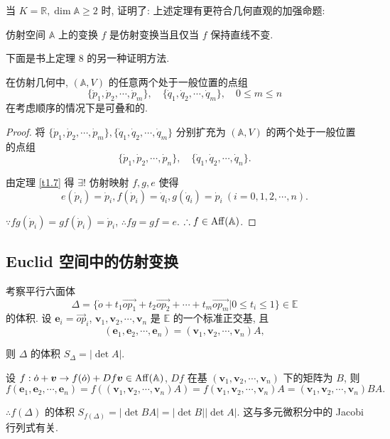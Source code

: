 \documentclass[color=black,device=normal,lang=cn,mode=geye]{elegantnote}
\begin{document}
当 $K=\mathbb{R},\dim\mathbb{A}\geq2$ 时, \cite[p41]{geometry} 证明了: 上述定理有更符合几何直观的加强命题:
\begin{theorem}
    仿射空间 $\mathbb{A}$ 上的变换 $f$ 是仿射变换当且仅当 $f$ 保持直线不变.
\end{theorem}
下面是书上定理 8 的另一种证明方法.
\begin{theorem}[书上的定理 8]\label{t3.8}
    在仿射几何中, $(\mathbb{A},V)$ 的任意两个处于一般位置的点组
    \[\{\dot{p}_1,\dot{p}_2,\cdots,\dot{p}_m\},\quad\{\dot{q}_1,\dot{q}_2,\cdots,\dot{q}_m\},\quad0\leq m\leq n\]
    在考虑顺序的情况下是可叠和的.
\end{theorem}
\begin{proof}
    将 $\{\dot{p}_1,\dot{p}_2,\cdots,\dot{p}_m\},\{\dot{q}_1,\dot{q}_2,\cdots,\dot{q}_m\}$ 分别扩充为 $(\mathbb{A},V)$ 的两个处于一般位置的点组
    \[\{\dot{p}_1,\dot{p}_2,\cdots,\dot{p}_n\},\quad\{\dot{q}_1,\dot{q}_2,\cdots,\dot{q}_n\}.\]

    由定理 \ref{t1.7} 得 $\exists!$ 仿射映射 $f,g,e$ 使得
    \[e(\dot{p}_i)=\dot{p}_i,f(\dot{p}_i)=\dot{q}_i,g(\dot{q}_i)=\dot{p}_i\ (i=0,1,2,\cdots,n).\]

    $\because fg(\dot{p}_i)=gf(\dot{p}_i)=\dot{p}_i$, $\therefore fg=gf=e$. $\therefore f\in\operatorname{Aff} (\mathbb{A})$.
\end{proof}
\subsection{Euclid 空间中的仿射变换}
考察平行六面体
\[\Delta=\{\dot{o}+t_1\overrightarrow{op_1}+t_2\overrightarrow{op_2}+\cdots+t_m\overrightarrow{op_m}|0\leq t_i\leq1\}\in\mathbb{E}\]
的体积. 设 $\boldsymbol{e}_i=\overrightarrow{op}_i$, $\boldsymbol{v}_1,\boldsymbol{v}_2,\cdots,\boldsymbol{v}_n$ 是 $\mathbb{E}$ 的一个标准正交基, 且
\[(\boldsymbol{e}_1,\boldsymbol{e}_2,\cdots,\boldsymbol{e}_n)=(\boldsymbol{v}_1,\boldsymbol{v}_2,\cdots,\boldsymbol{v}_n)A,\]

则 $\Delta$ 的体积 $S_\Delta=|\det A|$.

设 $f:\dot{o}+\boldsymbol{v}\to f(\dot{o})+Df\boldsymbol{v}\in\operatorname{Aff} (\mathbb{A})$, $Df$ 在基 $(\boldsymbol{v}_1,\boldsymbol{v}_2,\cdots,\boldsymbol{v}_n)$ 下的矩阵为 $B$, 则
\[f(\boldsymbol{e}_1,\boldsymbol{e}_2,\cdots,\boldsymbol{e}_n)=f((\boldsymbol{v}_1,\boldsymbol{v}_2,\cdots,\boldsymbol{v}_n)A)=f(\boldsymbol{v}_1,\boldsymbol{v}_2,\cdots,\boldsymbol{v}_n)A=(\boldsymbol{v}_1,\boldsymbol{v}_2,\cdots,\boldsymbol{v}_n)BA.\]

$\therefore f(\Delta)$ 的体积 $S_{f(\Delta)}=|\det BA|=|\det B||\det A|$. 这与多元微积分中的 Jacobi 行列式有关.
\end{document}
